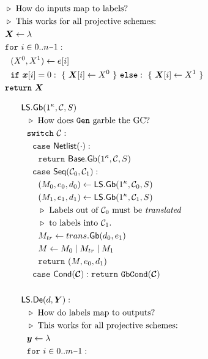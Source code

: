 \begin{figure}
\begin{adjustwidth}{-0.1\textwidth}{-0.1\textwidth}
\begin{minipage}[t]{0.56\linewidth}
\begin{align*}
      &~~\codecomment{How do inputs map to labels?}\\
      &~~\codecomment{This works for all projective schemes:}\\
      &~~\gcirinp \gets \emptystring\\
      &~~\cfor~i \in 0..n\minus 1:\\
      &~~~~(X^0, X^1) \gets e[i]\\
      &~~~~\cif~\cirinp[i] = 0:~\{~\gcirinp[i] \gets X^0~\}~\celse:~\{~\gcirinp[i] \gets X^1~\}\\
      &~~\creturn~\gcirinp
    \end{align*}
  \end{minipage}
  \begin{minipage}[t]{0.40\linewidth}
    \begin{align*}
      &\ourscheme.\gGb(1^\kappa, \cir, S)\\
      &~~\codecomment{How does \G garble the GC?}\\
      &~~\switch~\cir:\\
      &~~~~\ccase~\netlist(\cdot):\\
      &~~~~~~\creturn~\underscheme.\gGb(1^\kappa,\cir,S)\\
      &~~~~\ccase~\sequential(\cir_0, \cir_1):\\
      &~~~~~~(\mat_0, e_0, d_0) \gets \ourscheme.\gGb(1^\kappa,\cir_0, S)\\
      &~~~~~~(\mat_1, e_1, d_1) \gets \ourscheme.\gGb(1^\kappa,\cir_1, S)\\
      &~~~~~~\codecomment{Labels out of $\cir_0$ must be \emph{translated}}\\
      &~~~~~~\codecomment{to labels into $\cir_1$.}\\
      &~~~~~~\mat_{tr} \gets \gbtranslate(d_0,e_1)\\
      &~~~~~~\mat \gets \mat_0\mid \mat_{tr}\mid \mat_1\\
      &~~~~~~\creturn~(\mat, e_0, d_1)\\
      &~~~~\ccase~\conditional(\vec \cir): \creturn~\gbcond(\vec \cir)\\
      \\
      &\ourscheme.\gDe(d, \gcirout):\\
      &~~\codecomment{How do labels map to outputs?}\\
      &~~\codecomment{This works for all projective schemes:}\\
      &~~\cirout \gets \lambda\\
      &~~\cfor~i \in 0.. m\minus 1:\\

\end{align*}
\end{minipage}
\end{adjustwidth}
\end{figure}
